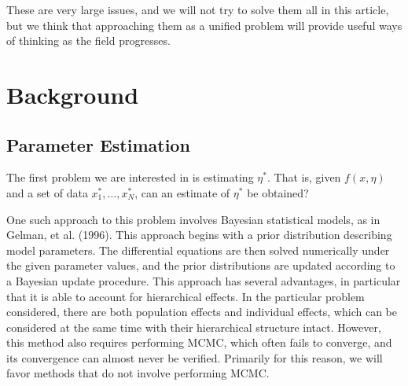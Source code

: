 \documentclass[12pt]{article}
\begin{document}


These are very large issues, and we will not try to solve them all in this article, but we think that approaching them as a unified problem will provide useful ways of thinking as the field progresses.





\section{Background}

\subsection{Parameter Estimation}

The first problem we are interested in is estimating $\eta^*$. That is, given $f(x,\eta)$ and a set of data $x^*_1, \ldots , x^*_N$, can an estimate of $\eta^*$ be obtained?

One such approach to this problem involves Bayesian statistical models, as in Gelman, et al. (1996). This approach begins with a prior distribution describing model parameters. The differential equations are then solved numerically under the given parameter values, and the prior distributions are updated according to a Bayesian update procedure. This approach has several advantages, in particular that it is able to account for hierarchical effects. In the particular problem considered, there are both population effects and individual effects, which can be considered at the same time with their hierarchical structure intact.\cite{gelman} However, this method also requires performing MCMC, which often fails to converge, and its convergence can almost never be verified.\cite{vehtari} Primarily for this reason, we will favor methods that do not involve performing MCMC.
\end{document}
